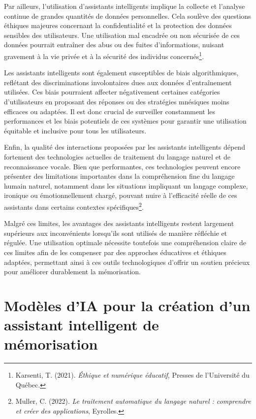 \documentclass[11pt,a4paper]{report}
\begin{document}
Par ailleurs, l’utilisation d'assistants intelligents implique la collecte et l’analyse continue de grandes quantités de données personnelles. Cela soulève des questions éthiques majeures concernant la confidentialité et la protection des données sensibles des utilisateurs. Une utilisation mal encadrée ou non sécurisée de ces données pourrait entraîner des abus ou des fuites d'informations, nuisant gravement à la vie privée et à la sécurité des individus concernés\footnote{Karsenti, T. (2021). \textit{Éthique et numérique éducatif}, Presses de l’Université du Québec.}.

Les assistants intelligents sont également susceptibles de biais algorithmiques, reflétant des discriminations involontaires dues aux données d’entraînement utilisées. Ces biais pourraient affecter négativement certaines catégories d’utilisateurs en proposant des réponses ou des stratégies mnésiques moins efficaces ou adaptées. Il est donc crucial de surveiller constamment les performances et les biais potentiels de ces systèmes pour garantir une utilisation équitable et inclusive pour tous les utilisateurs.

Enfin, la qualité des interactions proposées par les assistants intelligents dépend fortement des technologies actuelles de traitement du langage naturel et de reconnaissance vocale. Bien que performantes, ces technologies peuvent encore présenter des limitations importantes dans la compréhension fine du langage humain naturel, notamment dans les situations impliquant un langage complexe, ironique ou émotionnellement chargé, pouvant nuire à l'efficacité réelle de ces assistants dans certains contextes spécifiques\footnote{Muller, C. (2022). \textit{Le traitement automatique du langage naturel : comprendre et créer des applications}, Eyrolles.}.

Malgré ces limites, les avantages des assistants intelligents restent largement supérieurs aux inconvénients lorsqu'ils sont utilisés de manière réfléchie et régulée. Une utilisation optimale nécessite toutefois une compréhension claire de ces limites afin de les compenser par des approches éducatives et éthiques adaptées, permettant ainsi à ces outils technologiques d’offrir un soutien précieux pour améliorer durablement la mémorisation.

\section{Modèles d'IA pour la création d'un assistant intelligent de mémorisation}
\end{document}

